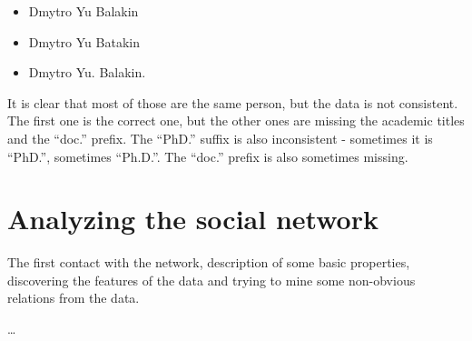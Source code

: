 \begin{itemize}
    \item Dmytro Yu Balakin
    \item Dmytro Yu Batakin
    \item Dmytro Yu. Balakin.
\end{itemize}

It is clear that most of those are the same person, but the data is not consistent. The first one is the correct one, but the other ones are missing the academic titles and the ``doc.'' prefix. The ``PhD.'' suffix is also inconsistent - sometimes it is ``PhD.'', sometimes ``Ph.D.''. The ``doc.'' prefix is also sometimes missing.

\section{Analyzing the social network}

The first contact with the network, description of some basic properties, discovering the features of the data and trying to mine some non-obvious relations from the data.

\dots
